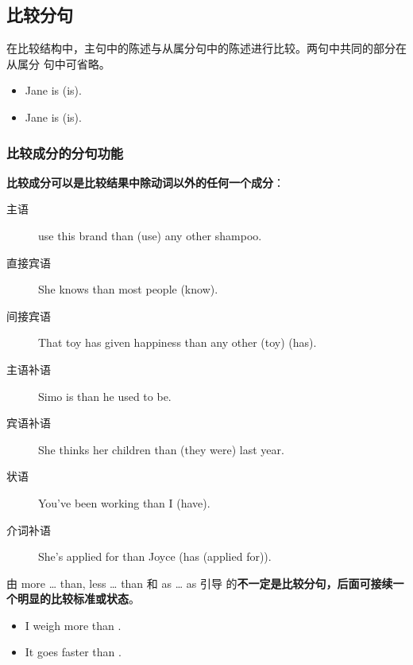 \subsection{比较分句}

在比较结构中，主句中的陈述与从属分句中的陈述进行比较。两句中共同的部分在从属分
句中可省略。
\begin{itemize}
\item Jane is     (is).
\item Jane is    (is).
\end{itemize}

\subsubsection{比较成分的分句功能}

\textbf{比较成分可以是比较结果中除动词以外的任何一个成分}：
\begin{description}
\item[主语]  use this brand than (use) any other shampoo.

\item[直接宾语] She knows  than most people (know).

\item[间接宾语] That toy has given  happiness than any other (toy) (has).

\item[主语补语] Simo is  than he used to be.

\item[宾语补语] She thinks her children  than (they were) last year.
\item[状语] You've been working  than I (have).

\item[介词补语] She's applied for  than Joyce (has (applied for)).
\end{description}

由 more \ldots{} than, less \ldots{} than 和 as \ldots{} as 引导
的\textbf{不一定是比较分句，后面可接续一个明显的比较标准或状态}。
\begin{itemize}
\item I weigh more than .

\item It goes faster than .

\end{itemize}

